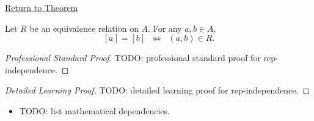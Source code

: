 \newpage
{}
\label{prf:rep-independence}

\begin{remark*}[Return]
\hyperref[lem:rep-independence]{Return to Theorem}
\end{remark*}

\begin{theorem*}
Let $R$ be an equivalence relation on $A$. For any $a,b \in A$,
\[
[a] = [b]
\;\;\Longleftrightarrow\;\;
(a,b) \in R.
\]
\end{theorem*}

\begin{proof}[Professional Standard Proof]
\LRAProofBodyStart
TODO: professional standard proof for rep-independence.
\end{proof}

\begin{proof}[Detailed Learning Proof]
\LRAProofBodyStart
TODO: detailed learning proof for rep-independence.
\end{proof}

\begin{remark*}
\end{remark*}

\begin{dependencies}
\begin{itemize}
  \item TODO: list mathematical dependencies.
\end{itemize}
\end{dependencies}

\clearpage
